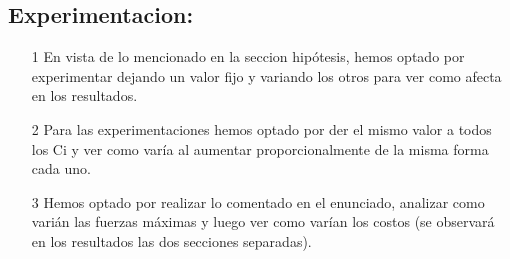 \subsection{Experimentacion:}

\begin{itemize}
\item[1] En vista de lo mencionado en la seccion hip\'otesis, hemos optado por experimentar dejando un valor fijo y variando los otros para ver como afecta en los resultados.

\item[2] Para las experimentaciones hemos optado por der el mismo valor a todos los Ci y ver como var\'ia al aumentar proporcionalmente de la misma forma cada uno.

\item[3] Hemos optado por realizar lo comentado en el enunciado, analizar como vari\'an las fuerzas m\'aximas y luego ver como var\'ian los costos (se observar\'a en los resultados las dos secciones separadas).

\end{itemize}

